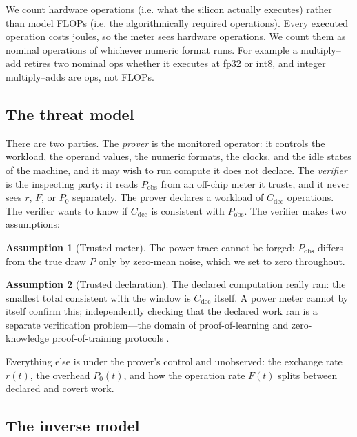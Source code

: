 \documentclass{article}
\theoremstyle{plain}
\theoremstyle{definition}
\newtheorem{assumption}[assumption]{Assumption}
\theoremstyle{remark}
\begin{document}
We count
hardware operations (i.e. what the silicon actually executes) rather than
model FLOPs (i.e. the algorithmically required operations).  Every executed operation costs joules, so
the meter sees hardware operations. We count them as
nominal operations of whichever numeric format runs. For example a multiply--add
retires two nominal ops whether it executes at fp32 or int8, and integer
multiply--adds are ops, not FLOPs. 

\subsection{The threat model}
\label{subsec:threat}

There are two parties. The \emph{prover} is the monitored operator: it controls the
workload, the operand values, the numeric formats, the clocks, and the idle
states of the machine, and it may wish to run compute it does not declare.
The \emph{verifier} is the inspecting party: it reads $P_{\mathrm{obs}}$ from
an off-chip meter it trusts, and it never sees $r$, $F$, or $P_0$ separately.
The prover declares a workload of $C_{\mathrm{dec}}$ operations. The verifier wants to know if  $C_{\mathrm{dec}}$ is consistent with $P_{\mathrm{obs}}$. The verifier makes two assumptions:
\begin{assumption}[Trusted meter]
\label{ass:meter}
The power trace cannot be forged: $P_{\mathrm{obs}}$ differs from the true
draw $P$ only by zero-mean noise, which we set to zero throughout.
\end{assumption}

\begin{assumption}[Trusted declaration]
\label{ass:declaration}
The declared computation really ran: the smallest total consistent with the
window is $C_{\mathrm{dec}}$ itself. A power meter cannot by itself confirm
this; independently checking that the declared work ran is a separate
verification problem---the domain of proof-of-learning and zero-knowledge
proof-of-training protocols \citep{jia2021proofoflearning,garg2023zkpot}.
\end{assumption}
Everything else is under the prover's control and unobserved: the exchange
rate $r(t)$, the overhead $P_0(t)$, and how the operation rate $F(t)$ splits
between declared and covert work.

\subsection{The inverse model}
\label{subsec:noninjective}
\end{document}
